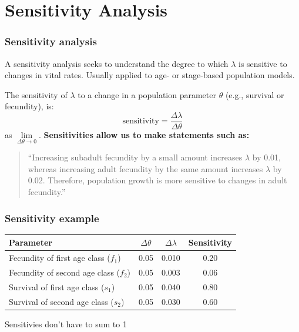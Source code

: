 \documentclass[color=usenames,dvipsnames]{beamer}\usepackage[]{graphicx}\usepackage[]{xcolor}
\begin{document}
\section{Sensitivity Analysis}


\begin{frame}
  \frametitle{Sensitivity analysis}
  A sensitivity analysis seeks to understand the degree to which
  $\lambda$ is sensitive to changes in vital rates.
  \pause
  \vfill
  Usually applied to age- or stage-based population models. \par
  \pause
  \vfill
  The sensitivity of $\lambda$ to a change in a population parameter
  $\theta$ (e.g., survival or fecundity), is:
  \[
    \text{sensitivity} = \frac{\Delta \lambda}{\Delta \theta}
  \]
  as $\lim\limits_{\Delta \theta \to 0}$. 
  \pause
  \vfill
  {\bf Sensitivities allow us to make statements such as:} \\
  \begin{quote}
  ``Increasing subadult fecundity by a small amount increases
  $\lambda$ by 0.01, whereas increasing adult fecundity by the same
  amount increases $\lambda$ by 0.02. Therefore, population growth is
  more sensitive to changes in adult fecundity.''
  \end{quote}
\end{frame}



\begin{frame}
  \frametitle{Sensitivity example}
  \centering
  \small
  \begin{tabular}{lccc}
    \hline
    Parameter & $\Delta \theta$ & $\Delta \lambda$ & Sensitivity \\
    \hline
    Fecundity of first age class ($f_1$)  & 0.05 & 0.010 & 0.20 \\ %
    Fecundity of second age class ($f_2$) & 0.05 & 0.003 & 0.06 \\ %
    Survival of first age class ($s_1$)   & 0.05 & 0.040 & 0.80 \\ %
    Survival of second age class ($s_2$)   & 0.05 & 0.030 & 0.60 \\
    \hline
  \end{tabular}
  \vfill
  \normalsize
  \centering Sensitivies don't have to sum to 1 \par
\end{frame}
\end{document}
